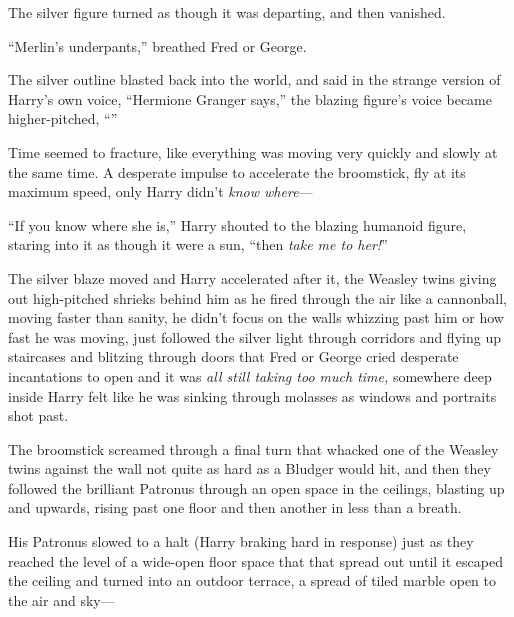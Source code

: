 The silver figure turned as though it was departing, and then vanished.

“Merlin’s underpants,” breathed Fred or George.

The silver outline blasted back into the world, and said in the strange version of Harry’s own voice, “Hermione Granger says,” the blazing figure’s voice became higher-pitched, “”

Time seemed to fracture, like everything was moving very quickly and slowly at the same time. A desperate impulse to accelerate the broomstick, fly at its maximum speed, only Harry didn’t \emph{know where}—

“If you know where she is,” Harry shouted to the blazing humanoid figure, staring into it as though it were a sun, “then \emph{take me to her!}”

The silver blaze moved and Harry accelerated after it, the Weasley twins giving out high-pitched shrieks behind him as he fired through the air like a cannonball, moving faster than sanity, he didn’t focus on the walls whizzing past him or how fast he was moving, just followed the silver light through corridors and flying up staircases and blitzing through doors that Fred or George cried desperate incantations to open and it was \emph{all still taking too much time,} somewhere deep inside Harry felt like he was sinking through molasses as windows and portraits shot past.

The broomstick screamed through a final turn that whacked one of the Weasley twins against the wall not quite as hard as a Bludger would hit, and then they followed the brilliant Patronus through an open space in the ceilings, blasting up and upwards, rising past one floor and then another in less than a breath.

His Patronus slowed to a halt (Harry braking hard in response) just as they reached the level of a wide-open floor space that that spread out until it escaped the ceiling and turned into an outdoor terrace, a spread of tiled marble open to the air and sky—

